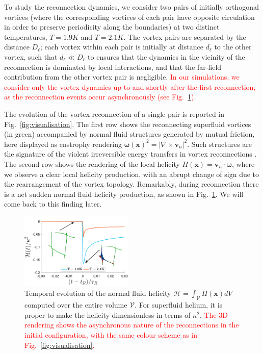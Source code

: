 \documentclass[%
 reprint,
 amsmath,amssymb,
 aps,
 prl,
]{revtex4-2}
\newcommand{\bom}{\boldsymbol{\omega}}
\def \v{\mathbf{v}}
\def \x{\mathbf{x}}
\def\red#1{\textcolor{red}{#1}}
\begin{document}
{To study the reconnection dynamics, we consider two pairs of initially orthogonal vortices (where the corresponding vortices of each pair have opposite circulation in order to preserve periodicity along the boundaries)
at two distinct temperatures, $T=1.9K$ and $T=2.1K$. The vortex pairs are separated by the distance $D_{\ell}$; each vortex within each pair is initially at distance $d_{\ell}$ to the other vortex, such that $d_{\ell}\ll D_{\ell}$ to ensures that the dynamics in the vicinity of the reconnection is dominated by local interactions, and that the far-field contribution from the other vortex pair is negligible. \red{In our simulations, we consider only the vortex dynamics up to and shortly after the first reconnection, as the reconnection events occur asynchronously (see Fig.~\ref{fig:total-helicity})}. 

The evolution of the vortex reconnection of a single pair is reported in Fig.~\ref{fig:visualisation}. 
The first row shows the reconnecting superfluid vortices (in green) accompanied by normal fluid structures generated by mutual friction, here displayed as enstrophy rendering $\bom(\x)^2=|\nabla\times \v_n|^2$. Such structures are the signature of the violent irreversible energy transfers in vortex reconnections 
\cite{stasiak2024quantum}. The second row shows the rendering of the local helicity $H(\x)=\v_n\cdot\bom$, where we observe a clear local helicity production, with an abrupt change of sign due to the rearrangement of the vortex topology. Remarkably, during reconnection there is a net 
sudden normal fluid helicity production, as shown in Fig.~\ref{fig:total-helicity}. We will come back to this finding later.
\begin{figure}[t]
    \centering
    \includegraphics*[width=0.48\textwidth]{helicity_normal_fluid.pdf}
\caption{Temporal evolution of the normal fluid helicity $\mathcal{H} = \int_{\mathcal{V}}H(\x)dV$ computed over the entire volume $\mathcal{V}$. For superfluid helium, it is proper to make the helicity dimensionless in terms of $\kappa^2$. \red{The 3D rendering shows the asynchronous nature of the reconnections in the initial configuration, with the same colour scheme as in Fig.~\ref{fig:visualisation}.}}
\label{fig:total-helicity}
\end{figure}

}
\end{document}
